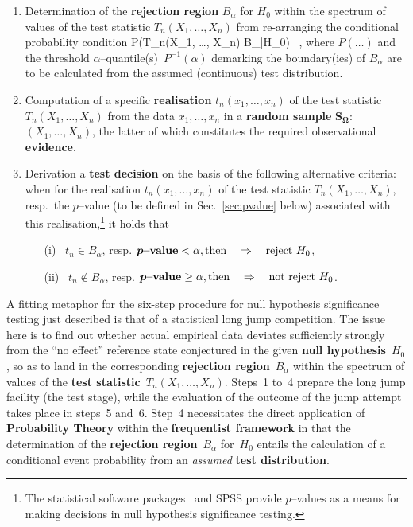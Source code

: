 \begin{enumerate}
\item Determination of the \textbf{rejection region}
$B_{\alpha}$ for $H_{0}$ within the spectrum of values of 
the test statistic $T_{n}(X_{1},\ldots, X_{n})$ from re-arranging 
the conditional probability condition
%
\be
P\left(T_{n}(X_{1}, \ldots, X_{n}) \in B_{\alpha}|H_{0}\right)
\stackrel{!}{\leq} \alpha \ ,
\ee
%
where $P(\ldots)$ and the threshold
$\alpha$--quantile(s)~$P^{-1}(\alpha)$ demarking the boundary(ies)
of $B_{\alpha}$ are to be calculated from the assumed (continuous)
test distribution.

\item Computation of a specific \textbf{realisation}
$t_{n}(x_{1}, \ldots, x_{n})$ of the test statistic
$T_{n}(X_{1}, \ldots, X_{n})$ from the data $x_{1}, 
\ldots, x_{n}$ in a \textbf{random sample} 
$\boldsymbol{S_{\Omega}}$:~$(X_{1}, \ldots, X_{n})$, the latter of 
which constitutes the required observational
\textbf{evidence}.%

\item Derivation a \textbf{test decision} on the basis of the 
following alternative criteria: when for the realisation 
$t_{n}(x_{1}, \ldots, x_{n})$ of the test statistic $T_{n}(X_{1}, 
\ldots, X_{n})$, resp.~the $p$--value (to be defined in 
Sec.~\ref{sec:pvalue} below) associated with this 
realisation,\footnote{The statistical software packages \R{}\ and
SPSS provide $p$--values as a means for making decisions in null
hypothesis significance testing.} it holds that%
%
\begin{itemize}
\item[(i)]\ $t_{n} \in B_{\alpha}$, resp.
$\boldsymbol{p}\text{{\bf--value}} < \alpha, \text{then}
\quad\Rightarrow\quad
\text{reject}~H_{0}$,\\[-5mm]
\item[(ii)]\ $t_{n} \notin B_{\alpha}$, resp.
$\boldsymbol{p}\text{{\bf--value}} \geq \alpha, \text{then}
\quad\Rightarrow\quad\text{not\ reject}~H_{0}$.%
\end{itemize}
%
\end{enumerate}
%

\medskip
\noindent
A fitting metaphor for the six-step procedure for null hypothesis significance testing just described is that of a statistical long
jump competition. The issue here is to find out whether actual
empirical data deviates sufficiently strongly from the
``no effect'' reference state conjectured in the
given \textbf{null hypothesis}~$H_{0}$, so as to land in the 
corresponding \textbf{rejection region}~$B_{\alpha}$ within the 
spectrum of values of the \textbf{test 
statistic}~$T_{n}(X_{1}, \ldots, X_{n})$. Steps~1 to~4 prepare the 
long jump facility (the test stage), while the evaluation of the 
outcome of the jump attempt takes place in steps~5 and~6. Step~4 
necessitates the direct application of \textbf{Probability Theory}
within the \textbf{frequentist framework} in that the determination
of the \textbf{rejection region}~$B_{\alpha}$ for~$H_{0}$ entails
the calculation of a conditional event probability from an
\textit{assumed} \textbf{test distribution}.

